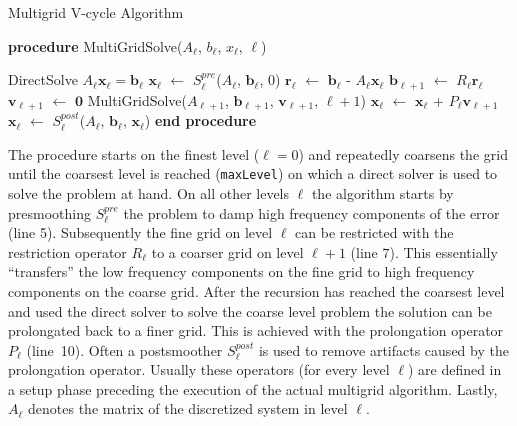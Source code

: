 \begin{algorithm}
  \caption{Multigrid V-cycle Algorithm} \label{alg:mg_algo}
  \begin{algorithmic}[1]
    \STATE \textbf{procedure} MultiGridSolve($A_\ell$, $b_\ell$, $x_\ell$, $\ell$)
    
    \STATE DirectSolve $A_\ell \mathbf{x}_\ell = \mathbf{b}_\ell$
    \ELSE
    \STATE $\mathbf{x}_\ell$ $\leftarrow$ $S^{pre}_\ell$($A_\ell$, $\mathbf{b}_\ell$, $0$)
    \STATE $\mathbf{r}_\ell$ $\leftarrow$ $\mathbf{b}_\ell$ - $A_\ell
    \mathbf{x}_\ell$ 
    \STATE $\mathbf{b}_{\ell+1}$ $\leftarrow$ $R_\ell \mathbf{r}_\ell$
    \STATE $\mathbf{v}_{\ell+1}$ $\leftarrow$ $\mathbf{0}$
    \STATE MultiGridSolve($A_{\ell+1}$, $\mathbf{b}_{\ell+1}$,
    $\mathbf{v}_{\ell+1}$, $\ell+1$) 
    \STATE $\mathbf{x}_\ell$ $\leftarrow$ $\mathbf{x}_\ell$ + $P_\ell
    \mathbf{v}_{\ell+1}$  
    \STATE $\mathbf{x}_\ell$ $\leftarrow$ $S^{post}_\ell$($A_\ell$,
    $\mathbf{b}_\ell$, $\mathbf{x}_\ell$) 
    \ENDIF
    \STATE \textbf{end procedure}
  \end{algorithmic}
\end{algorithm}

The procedure starts on the finest level ($\ell\!=\!0$) and repeatedly
coarsens the grid until the coarsest level is reached
(\texttt{maxLevel}) on which a direct solver is used to solve the
problem at hand.  On all other levels $\ell$ the algorithm starts by
presmoothing $S_\ell^{pre}$ the problem to damp high frequency
components of the error (line 5).  Subsequently the fine grid on level
$\ell$ can be restricted with the restriction operator $R_\ell$ to a
coarser grid on level $\ell+ 1$ (line $7$).  This essentially
``transfers'' the low frequency components on the fine grid to high
frequency components on the coarse grid.  After the recursion has
reached the coarsest level and used the direct solver to solve the
coarse level problem the solution can be prolongated back to a finer
grid.  This is achieved with the prolongation operator $P_\ell$
(line~10).  Often a postsmoother $S_\ell^{post}$ is used to remove
artifacts caused by the prolongation operator.  Usually these operators
(for every level $\ell$) are defined in a setup phase preceding the
execution of the actual multigrid algorithm.  Lastly, $A_\ell$ denotes
the matrix of the discretized system in level $\ell$. 


